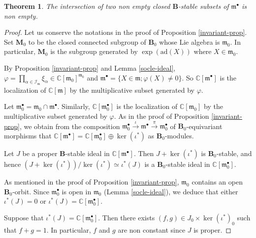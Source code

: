 \documentclass{amsart}
\newtheorem{theorem}{Theorem}[section]
\theoremstyle{definition}
\theoremstyle{remark}
\numberwithin{equation}{section}
\newcommand{\soc}[1]{\mathcal{I}_{#1}}
\newcommand{\group}[1]{\mathbf{#1}}
\begin{document}
\begin{theorem}\label{intersection-theorem}
The intersection of two non empty closed $\group{B}$-stable subsets of $\mathfrak{m}^{\bullet}$
is non empty.
\end{theorem}
\begin{proof}
Let us conserve the notations in the proof of Proposition \ref{invariant-prop}.
Set $\group{M}_{0}$  to be the closed connected subgroup
of $\group{B}_{0}$ whose Lie algebra is $\mathfrak{m}_{0}$.
In particular, $\group{M}_{0}$ is the subgroup generated by $\exp (\mathrm{ad} (X))$
where $X\in \mathfrak{m}_{0}$.

By Proposition \ref{invariant-prop} and Lemma \ref{socle-ideal}, $\varphi = \prod_{\alpha \in \soc{\mathfrak{m}}} \xi_{\alpha} \in 
\mathbb{C}[\mathfrak{m}_{0}]^{\mathfrak{m}_{0}}$
and $\mathfrak{m}^{\bullet} = \{ X \in \mathfrak{m} ; \varphi (X) \neq 0\}$. 
So
$\mathbb{C}[\mathfrak{m}^{\bullet}]$ is the localization
of $\mathbb{C}[\mathfrak{m}]$ by the multiplicative subset generated by $\varphi$.

Let $\mathfrak{m}_{0}^{\bullet} = \mathfrak{m}_{0} \cap \mathfrak{m}^{\bullet}$. Similarly, 
$\mathbb{C}[\mathfrak{m}_{0}^{\bullet} ]$  is the localization 
of $\mathbb{C}[\mathfrak{m}_{0}]$ by the multiplicative subset generated by $\varphi$.
As in the proof of Proposition \ref{invariant-prop}, we obtain from the composition 
$
\mathfrak{m}_{0}^{\bullet} \stackrel{\iota}{\rightarrow} \mathfrak{m}^{\bullet} 
\stackrel{\pi}{\rightarrow} \mathfrak{m}_{0}^{\bullet}
$
of $\group{B}_{0}$-equivariant morphisms that 
$
\mathbb{C}[\mathfrak{m}^{\bullet} ]= \mathbb{C}[\mathfrak{m}_{0}^{\bullet} ]
\oplus \ker (\iota^{*})
$
as $\group{B}_{0}$-modules. 

Let $J$ be a proper $\group{B}$-stable ideal in $\mathbb{C}[\mathfrak{m}^{\bullet} ]$.
Then $J + \ker (\iota^{*})$ is $\group{B}_{0}$-stable, and hence
$
(J + \ker (\iota^{*}) ) /  \ker (\iota^{*}) \simeq \iota^{*} ( J )
$
is a $\group{B}_{0}$-stable ideal in $\mathbb{C}[\mathfrak{m}_{0}^{\bullet} ]$.

As mentioned in the proof of Proposition \ref{invariant-prop},
$\mathfrak{m}_{0}$ contains an open $\group{B}_{0}$-orbit. Since $\mathfrak{m}_{0}^{\bullet}$
is open in $\mathfrak{m}_{0}$ (Lemma \ref{socle-ideal}), we deduce that either $\iota^{*} ( J ) = 0$ or 
$\iota^{*} ( J ) = \mathbb{C}[\mathfrak{m}_{0}^{\bullet} ]$.

Suppose that $\iota^{*} ( J ) = \mathbb{C}[\mathfrak{m}_{0}^{\bullet} ]$.
Then there exists $(f,g) \in J_{0} \times \ker (\iota^{*})_{0}$ such that 
$f+g =1$. In particular, $f$ and $g$ are non constant since $J$ is proper.


\end{proof}
\end{document}
